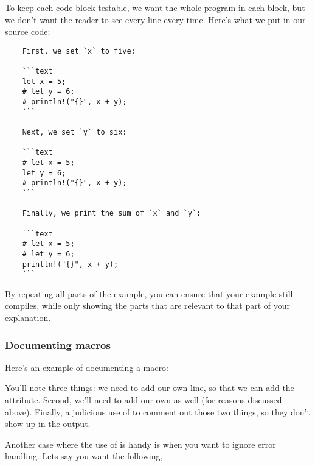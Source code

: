 To keep each code block testable, we want the whole program in each block, but we don't want the reader to see every line every time. 
Here's what we put in our source code:

\begin{verbatim}
    First, we set `x` to five:

    ```text
    let x = 5;
    # let y = 6;
    # println!("{}", x + y);
    ```

    Next, we set `y` to six:

    ```text
    # let x = 5;
    let y = 6;
    # println!("{}", x + y);
    ```

    Finally, we print the sum of `x` and `y`:

    ```text
    # let x = 5;
    # let y = 6;
    println!("{}", x + y);
    ```
\end{verbatim}

By repeating all parts of the example, you can ensure that your example still compiles, while only showing the parts that are relevant 
to that part of your explanation.

\subsubsection*{Documenting macros}

Here’s an example of documenting a macro:


You’ll note three things: we need to add our own  line, so that we can add the  attribute. 
Second, we’ll need to add our own  as well (for reasons discussed above). Finally, a judicious use of \code{\#} to 
comment out those two things, so they don’t show up in the output.

\blank

Another case where the use of \code{\#} is handy is when you want to ignore error handling. Lets say you want the following,

